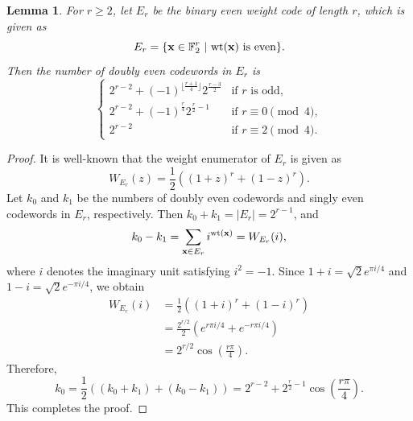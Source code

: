 \documentclass{article}
\newtheorem{lemma}[theorem]{Lemma}
\theoremstyle{definition}
\theoremstyle{remark}
\begin{document}
\begin{lemma}\label{doublyevencodeword}
    For $r\ge 2$, let $E_{r}$ be the binary even weight code of length $r$, which is given as
    \[
    E_r=\{\mathbf{x}\in\mathbb{F}_2^r~|~{\rm wt}(\mathbf{x})\mbox{ is even}\}.
    \]
    Then the number of doubly even codewords in $E_{r}$ is
    \[
    \begin{cases}
        2^{r-2}+(-1)^{\lfloor\frac{r+1}{4}\rfloor}2^{\frac{r-3}{2}} & \text{if }r\text{ is odd},\\
        2^{r-2}+(-1)^{\frac{r}{4}}2^{\frac{r}{2}-1} & \text{if }r\equiv 0\pmod 4,\\
        2^{r-2} & \text{if }r\equiv 2\pmod 4.
    \end{cases}
    \]
\end{lemma}
\begin{proof}
    It is well-known that the weight enumerator of $E_r$ is given as
    \[
    W_{E_r}(z)=\frac{1}{2}((1+z)^r+(1-z)^r).
    \]
    Let $k_0$ and $k_1$ be the numbers of doubly even codewords and singly even codewords in $E_{r}$, respectively. Then $k_0+k_1=|E_r|=2^{r-1}$, and
    \[
    k_0-k_1=\sum_{\mathbf{x}\in E_r} i^{{\rm{wt}}(\mathbf{x})} = W_{E_r}(i),
    \]
    where $i$ denotes the imaginary unit satisfying $i^2=-1$. Since $1+i=\sqrt{2}e^{\pi i/4}$ and $1-i=\sqrt{2}e^{-\pi i/4}$, we obtain
    \begin{align*}
    W_{E_r}(i)&=\frac{1}{2}((1+i)^r+(1-i)^r)\\&=\frac{2^{r/2}}{2}(e^{r\pi i/4}+e^{-r\pi i/4})\\&=2^{r/2}\cos\left({\frac{r\pi}{4}}\right).
    \end{align*}
    Therefore,
    \[
    k_0=\frac{1}{2}((k_0+k_1)+(k_0-k_1))=2^{r-2}+2^{\frac{r}{2}-1}\cos\left(\frac{r\pi}{4}\right).
    \]
    This completes the proof.
\end{proof}
\end{document}
